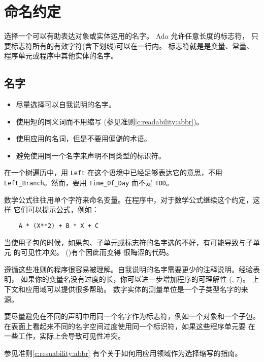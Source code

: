 \section{命名约定}
选择一个可以有助表达对象或实体运用的名字。 Ada 允许任意长度的标志符，
只要标志符所有的有效字符(含下划线)可以在一行内。 标志符就是是变量、常量、
程序单元或程序中其他实体的名字。

\subsection{名字}

\begin{itemize}
    \item 尽量选择可以自我说明的名字。
    \item 使用短的同义词而不用缩写 (参见准则\ref{c:readability:abbr})。
    \item 使用应用的名词，但是不要用偏僻的术语。
    \item 避免使用同一个名字来声明不同类型的标识符。
\end{itemize}

\begin{blockindent}
在一个树遍历中，用 \texttt{Left} 在这个语境中已经足够表达它的意思，不用
\texttt{Left\_Branch}。然而，要用 \texttt{Time\_Of\_Day} 而不是 \texttt{TOD}。

数学公式往往用单个字符来命名变量。在程序中，对于数学公式继续这个约定，这样
它们可以提示公式，例如：
\begin{lstlisting}
    A * (X**2) + B * X + C
\end{lstlisting}
当使用子包的时候，如果包、子单元或标志符的名字选的不好，有可能导致与子单元
的可见性冲突。\cite{rational95} ()有个因此而变得
很晦涩的代码。
\end{blockindent}

\begin{blockindent}
遵循这些准则的程序很容易被理解。自我说明的名字需要更少的注释说明。经验表明，
如果你的变量名没有过度的长，你可以进一步增加程序的可理解性 (\cite{sch86}, 7)。
上下文和应用域可以提供很多帮助。 数字实体的测量单位是一个子类型名字的来源。

要尽量避免在不同的声明中用同一个名字作为标志符，例如一个对象和一个子包。
在表面上看起来不同的名字空间过度使用同一个标识符，如果这些程序单元要
在一些工作，实际上会导致可见性冲突。
\end{blockindent}

\begin{blockindent}
参见准则\ref{c:resuability:abbr} 有个关于如何用应用领域作为选择缩写的指南。
\end{blockindent}

